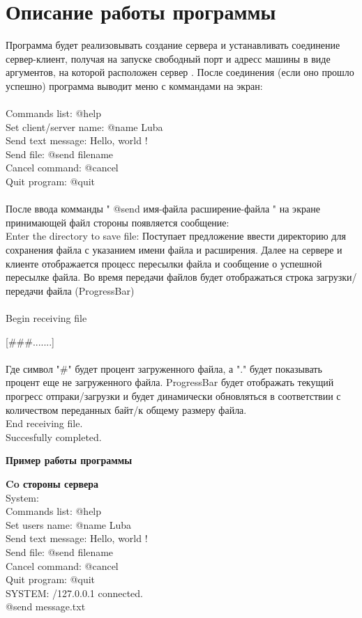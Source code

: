 \documentclass[12pt,a4paper]{article}
\begin{document}
\section*{Описание работы программы}

Программа будет реализовывать создание сервера и  устанавливать соединение сервер-клиент, получая на запуске   свободный порт и адресс машины в виде аргументов, на которой расположен сервер . После соединения (если оно прошло успешно) программа выводит меню с коммандами на экран:
\\
\\Commands list: @help
\\Set client/server name: @name Luba
\\Send text message: Hello, world !
\\Send file: @send filename
\\Cancel command: @cancel
\\Quit program: @quit
\\
\\
После ввода комманды " @send имя-файла расширение-файла " на экране принимающей файл стороны появляется сообщение:
\\ Enter the directory to save file:
Поступает предложение ввести директорию для сохранения файла с указанием имени файла и
расширения. Далее на сервере и клиенте отображается процесс пересылки
файла и сообщение о успешной пересылке файла. Во время передачи файлов будет отображаться строка загрузки/передачи файла
(ProgressBar)
\\
\\ Begin receiving file

 [\#\#\#.......]
 \\
 \\
 Где символ "\#" будет процент загруженного файла, а "." будет показывать процент еще не загруженного файла. ProgressBar будет отображать текущий прогресс отпраки/загрузки и будет динамически обновляться в соответствии с количеством переданных байт/к общему размеру файла.
\\End receiving file.
\\Succesfully completed.

\newpage
\begin{center}
\Large{\bf Пример работы программы }
\end{center}

\Large{\bf Co стороны сервера }
\\System:
\\Commands list: @help
\\Set users name: @name Luba
\\Send text message: Hello, world !
\\Send file: @send filename
\\Cancel command: @cancel
\\Quit program: @quit
\\SYSTEM: /127.0.0.1 connected.
\\@send message.txt
\\[\#\#\#\#\#.......]
\end{document}
